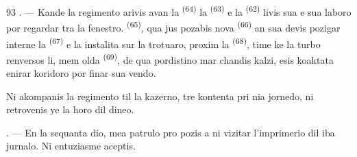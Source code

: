 \begin{VUpage}[95]{93}
. --- Kande la regimento arivis avan la\nl
{} \textsuperscript{(64)} la  \textsuperscript{(63)} e la \cc
{} \textsuperscript{(62)} livis sua  e sua laboro por\nl
regardar tra la fenestro.  \textsuperscript{(65)}, qua\nl
jus pozabis nova  \textsuperscript{(66)} an sua \nl
devis pozigar interne la  \textsuperscript{(67)} e la \nl
instalita sur la trotuaro, proxim la \cc
{} \textsuperscript{(68)}, time ke la turbo renversos li, mem\nl
olda  \textsuperscript{(69)}, de qua pordistino mar\cc
chandis kalzi, esis koaktata enirar koridoro\nl
por finar sua vendo.

\VUblancAlinea
Ni akompanis la regimento til la kazerno, \nl
tre kontenta pri nia jornedo, ni retrovenis ye\nl
la horo dil dineo.

\VUsaut{3.0mm}

. --- En la sequanta dio, mea patrulo pro\cc
pozis a ni vizitar l'imprimerio dil iba jurnalo.\nl
Ni entuziasme aceptis.
\end{VUpage}

